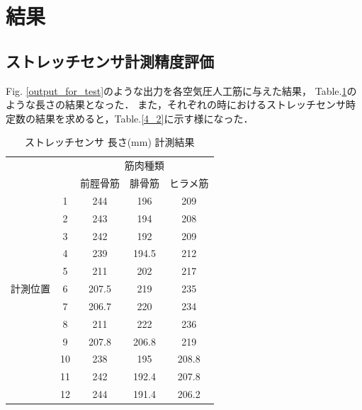 \section{結果}
\subsection{ストレッチセンサ計測精度評価}
Fig. \ref{output_for_test}のような出力を各空気圧人工筋に与えた結果，
Table.\ref{strain}のような長さの結果となった．
また，それぞれの時におけるストレッチセンサ時定数の結果を求めると，Table.\ref{4_2}に示す様になった．
\begin{table}[h]
    \caption{ストレッチセンサ 長さ(mm) 計測結果}
    \label{strain}
    \begin{center}
        \begin{tabular}{|c|c|ccc|}\hline
            \multicolumn{2}{|c|}{} & \multicolumn{3}{c|}{筋肉種類}\\
            \cline{3-5}
            \multicolumn{2}{|c|}{} & 前脛骨筋 & 腓骨筋 & ヒラメ筋 \\ \hline
            & 1 & 244 & 196 & 209 \\ \cline{2-5}
            & 2 & 243 & 194 & 208 \\ \cline{2-5}
            & 3 & 242 & 192 & 209 \\ \cline{2-5}
            & 4 & 239 & 194.5 & 212 \\ \cline{2-5}
            & 5 & 211 & 202 & 217 \\ \cline{2-5}
            計測位置 & 6 & 207.5 & 219 & 235 \\ \cline{2-5}
            & 7 & 206.7 & 220 & 234 \\ \cline{2-5}
            & 8 & 211 & 222 & 236 \\ \cline{2-5}
            & 9 & 207.8 & 206.8 & 219 \\ \cline{2-5}
            & 10 & 238 & 195 & 208.8 \\ \cline{2-5}
            & 11 & 242 & 192.4 & 207.8 \\ \cline{2-5}
            & 12 & 244 & 191.4 & 206.2 \\ \hline
        \end{tabular}
    \end{center}
\end{table}

\newpage

